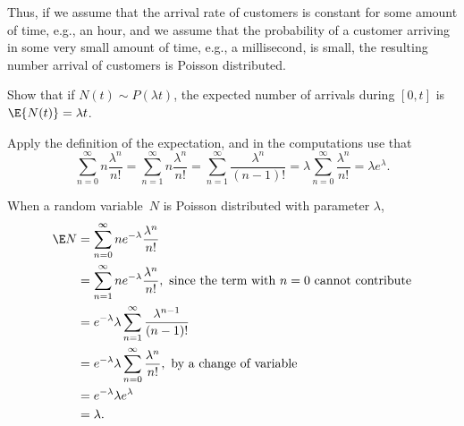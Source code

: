 Thus, if we assume that the arrival rate of customers is constant for some amount of time, e.g., an hour, and we assume that the probability of a customer arriving in some very small amount of time,  e.g., a millisecond, is small, the resulting number arrival of customers is Poisson distributed. 


\begin{exercise}\label{ex:2}
  Show that if $N(t)\sim P(\lambda t)$, the expected number of arrivals during $[0,t]$ is $\E{N(t)} = \lambda t$.
  \begin{hint}
Apply the definition of the expectation, and in the computations use that 
\begin{equation*}
\sum_{n=0}^\infty n \frac{\lambda^n}{n!} = \sum_{n=1}^\infty n \frac{\lambda^n}{n!} = \sum_{n=1}^\infty \frac{\lambda^n}{(n-1)!} = \lambda \sum_{n=0}^\infty \frac{\lambda^n}{n!} = \lambda e^{\lambda}.
\end{equation*}
  \end{hint}
  \begin{solution} 
    When a random variable~$N$ is Poisson distributed with parameter
    $\lambda$,
    \begin{align*}
      \E N 
&= \sum_{n=0}^\infty n e^{-\lambda}\frac{\lambda^n}{n!}  \\
&= \sum_{n=1}^\infty n e^{-\lambda}\frac{\lambda^n}{n!}, \text{ since the term with $n=0$ cannot contribute} \\
&= e^{-\lambda} \lambda \sum_{n=1}^\infty \frac{\lambda^{n-1}}{(n-1)!} \\
&= e^{-\lambda} \lambda \sum_{n=0}^\infty \frac{\lambda^{n}}{n!}, \text{ by a change of variable}\\
&= e^{-\lambda} \lambda e^{\lambda} \\
&= \lambda.
    \end{align*}
\end{solution}
\end{exercise}


